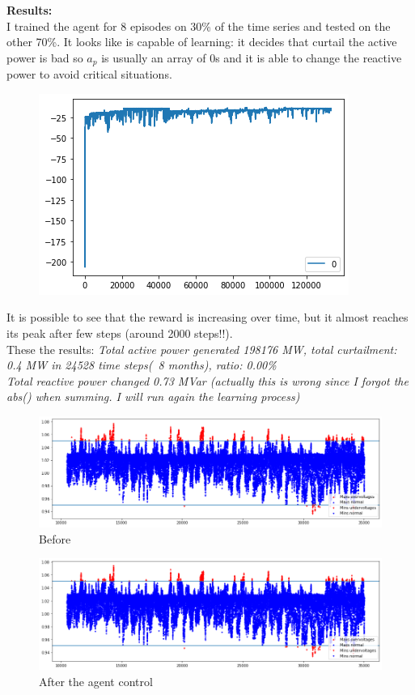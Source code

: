 \textbf{Results:}\\
I trained the agent for 8 episodes on 30\% of the time series and tested on the other 70\%. It looks like is capable of learning: it decides that curtail the active power is bad so $a_p$ is usually an array of 0s and it is able to change the reactive power to avoid critical situations.
\begin{figure}[H]
\centering
    \includegraphics[width=.6\linewidth]{images/RL/Reward plot.png}
\end{figure}
It is possible to see that the reward is increasing over time, but it almost reaches its peak after few steps (around 2000 steps!!).\\
These the results:
\emph{Total active power generated 198176 MW, total curtailment: 0.4 MW in 24528 time steps(~8 months), ratio: 0.00\%\\

Total reactive power changed 0.73 MVar (actually this is wrong since I forgot the abs() when summing. I will run again the learning process)}
\newpage
\begin{figure}[H]
\centering
    \includegraphics[width=.75\linewidth]{images/RL/before 0.3.png}
    \caption{Before}
\end{figure}
\begin{figure}[H]
\centering
    \includegraphics[width=.75\linewidth]{images/RL/after 0.3.png}
    \caption{After the agent control}
\end{figure}


